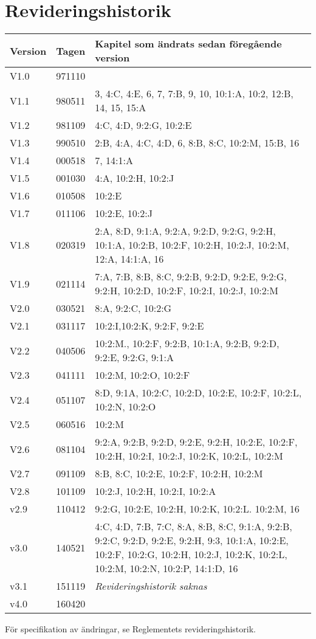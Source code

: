 \documentclass[10pt]{article}
\begin{document}
\section*{Revideringshistorik}
\begin{center}
\begin{tabular}{| l | l | p{10cm} |}
    \hline
    Version & Tagen & Kapitel som ändrats sedan föregående version \\
    \hline
    V1.0 & 971110 & \\
    \hline
    V1.1 & 980511 & 3, 4:C, 4:E, 6, 7, 7:B, 9, 10, 10:1:A, 10:2, 12:B,
    14, 15, 15:A \\
    \hline
    V1.2 & 981109 & 4:C, 4:D, 9:2:G, 10:2:E \\
    \hline
    V1.3 & 990510 & 2:B, 4:A, 4:C, 4:D, 6, 8:B, 8:C, 10:2:M, 15:B, 16 \\
    \hline
    V1.4 & 000518 & 7, 14:1:A \\
    \hline
    V1.5 & 001030 & 4:A, 10:2:H, 10:2:J \\
    \hline
    V1.6 & 010508 & 10:2:E \\
    \hline
    V1.7 & 011106 & 10:2:E, 10:2:J \\
    \hline
    V1.8 & 020319 & 2:A, 8:D, 9:1:A, 9:2:A, 9:2:D, 9:2:G, 9:2:H, 10:1:A,
    10:2:B, 10:2:F, 10:2:H, 10:2:J, 10:2:M, 12:A, 14:1:A, 16 \\
    \hline
    V1.9 & 021114 & 7:A, 7:B, 8:B, 8:C, 9:2:B, 9:2:D, 9:2:E, 9:2:G,
    9:2:H, 10:2:D, 10:2:F, 10:2:I, 10:2:J, 10:2:M \\
    \hline
    V2.0 & 030521 & 8:A, 9:2:C, 10:2:G \\
    \hline
    V2.1 & 031117 & 10:2:I,10:2:K, 9:2:F, 9:2:E \\
    \hline
    V2.2 & 040506 & 10:2:M., 10:2:F, 9:2:B, 10:1:A, 9:2:B, 9:2:D, 9:2:E,
    9:2:G, 9:1:A \\
    \hline
    V2.3 & 041111 & 10:2:M, 10:2:O, 10:2:F \\
    \hline
    V2.4 & 051107 & 8:D, 9:1A, 10:2:C, 10:2:D, 10:2:E, 10:2:F, 10:2:L,
    10:2:N, 10:2:O \\
    \hline
    V2.5 & 060516 & 10:2:M \\
    \hline
    V2.6 & 081104 & 9:2:A, 9:2:B, 9:2:D, 9:2:E, 9:2:H, 10:2:E, 10:2:F,
    10:2:H, 10:2:I, 10:2:J, 10:2:K, 10:2:L, 10:2:M \\
    \hline
    V2.7 & 091109 &  8:B, 8:C, 10:2:E, 10:2:F, 10:2:H, 10:2:M\\
    \hline
    V2.8 & 101109 & 10:2:J, 10:2:H, 10:2:I, 10:2:A\\
    \hline
    v2.9 & 110412 & 9:2:G, 10:2:E, 10:2:H, 10:2:K, 10:2:L. 10:2:M, 16 \\
    \hline
    v3.0 & 140521 &  4:C, 4:D, 7:B, 7:C, 8:A, 8:B, 8:C, 9:1:A, 9:2:B, 9:2:C, 9:2:D, 9:2:E, 9:2:H, 9:3, 10:1:A, 10:2:E, 10:2:F, 10:2:G, 10:2:H, 10:2:J, 10:2:K, 10:2:L, 10:2:M, 10:2:N, 10:2:P, 14:1:D, 16\\
    \hline
    v3.1 & 151119 & \emph{Revideringshistorik saknas} \\
    \hline
    v4.0 & 160420 &  \\
    \hline
\end{tabular}
\end{center}
För specifikation av ändringar, se Reglementets revideringshistorik.
\end{document}
